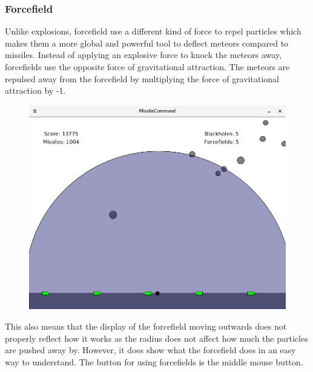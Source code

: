 \documentclass{article}
\begin{document}
\subsubsection*{Forcefield}
Unlike explosions, forcefield use a different kind of force to repel particles which makes them a more global and powerful tool to deflect meteors compared to missiles. Instead of applying an explosive force to knock the meteors away, forcefields use the opposite force of gravitational attraction. The meteors are repulsed away from the forcefield by multiplying the force of gravitational attraction by -1. 
\begin{figure}[H]
\centering
\includegraphics[width=1\textwidth]{imgs/Forcefield.png}
\end{figure}
\noindent
This also means that the display of the forcefield moving outwards does not properly reflect how it works as the radius does not affect how much the particles are pushed away by. However, it does show what the forcefield does in an easy way to understand. The button for using forcefields is the middle mouse button.
\end{document}
